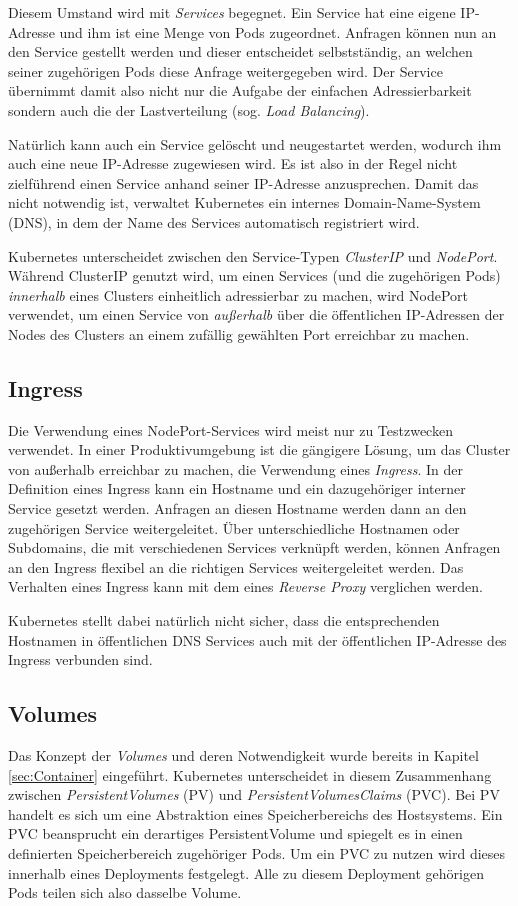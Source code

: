 \documentclass[11pt,a4paper]{article}
\begin{document}
Diesem Umstand wird mit \emph{Services} begegnet. Ein Service hat eine eigene IP-Adresse und ihm ist eine Menge
von Pods zugeordnet. Anfragen können nun an den Service gestellt werden und dieser entscheidet selbstständig,
an welchen seiner zugehörigen Pods diese Anfrage weitergegeben wird. Der Service übernimmt damit also 
nicht nur die Aufgabe der einfachen Adressierbarkeit sondern auch die der Lastverteilung (sog. \emph{Load Balancing}).

Natürlich kann auch ein Service gelöscht und neugestartet werden, wodurch ihm auch eine neue IP-Adresse zugewiesen wird.
Es ist also in der Regel nicht zielführend einen Service anhand seiner IP-Adresse anzusprechen.
Damit das nicht notwendig ist, verwaltet Kubernetes ein internes Domain-Name-System (DNS), in dem
der Name des Services automatisch registriert wird.

Kubernetes unterscheidet zwischen den Service-Typen \emph{ClusterIP} und \emph{NodePort}.
Während ClusterIP genutzt wird, um einen Services (und die zugehörigen Pods) \emph{innerhalb} eines Clusters
einheitlich adressierbar zu machen, wird NodePort verwendet, um einen Service von \emph{außerhalb}
über die öffentlichen IP-Adressen der Nodes des Clusters an einem zufällig gewählten Port erreichbar zu machen.

\subsection{Ingress}
\label{sec:Ingress}
Die Verwendung eines NodePort-Services wird meist nur zu Testzwecken verwendet. In einer Produktivumgebung
ist die gängigere Lösung, um das Cluster von außerhalb erreichbar zu machen, die Verwendung eines \emph{Ingress}.
In der Definition eines Ingress kann ein Hostname und ein dazugehöriger interner Service gesetzt werden.
Anfragen an diesen Hostname werden dann an den zugehörigen Service weitergeleitet. Über unterschiedliche Hostnamen
oder Subdomains, die mit verschiedenen Services verknüpft werden, können Anfragen an den Ingress flexibel
an die richtigen Services weitergeleitet werden. Das Verhalten eines Ingress kann mit dem eines \emph{Reverse Proxy}
verglichen werden.

Kubernetes stellt dabei natürlich nicht sicher, dass die entsprechenden Hostnamen in öffentlichen DNS Services auch mit
der öffentlichen IP-Adresse des Ingress verbunden sind.

\subsection{Volumes}
Das Konzept der \emph{Volumes} und deren Notwendigkeit wurde bereits in Kapitel \ref{sec:Container} eingeführt.
Kubernetes unterscheidet in diesem Zusammenhang zwischen \emph{PersistentVolumes} (PV) und \emph{PersistentVolumesClaims} (PVC).
Bei PV handelt es sich um eine Abstraktion eines Speicherbereichs des Hostsystems.
Ein PVC beansprucht ein derartiges PersistentVolume und spiegelt es in einen
definierten Speicherbereich zugehöriger Pods. Um ein PVC zu nutzen wird dieses innerhalb eines Deployments festgelegt.
Alle zu diesem Deployment gehörigen Pods teilen sich also dasselbe Volume.
\end{document}
